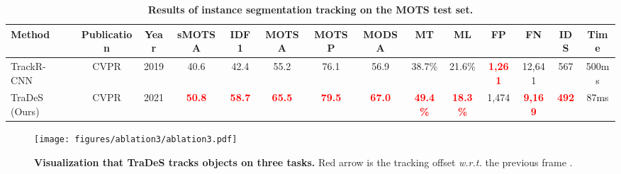 \documentclass[final]{cvpr}
\begin{document}
\begin{table*}[!htb]
	\begin{center}	
		\setlength{\tabcolsep}{1.5pt}
		\small
		\begin{tabular}{l|cc|ccccccccccc }
			\shline
			\rowcolor{mygray}
			Method&Publication&Year&sMOTSA &IDF1 &MOTSA &MOTSP &MODSA &MT & ML &FP&FN&IDS &Time\\ 
			\hline
			\hline
			TrackR-CNN~\cite{mots_dataset} &CVPR&2019&40.6&42.4&55.2&76.1&56.9&38.7\%&21.6\%&\textcolor{red}{\bf 1,261}&12,641&567&500ms\\
			TraDeS (Ours)&CVPR&2021&\textcolor{red}{\bf 50.8}&\textcolor{red}{\bf 58.7}&\textcolor{red}{\bf 65.5} &\textcolor{red}{\bf 79.5}&\textcolor{red}{\bf 67.0}&\textcolor{red}{\bf 49.4\%}&\textcolor{red}{\bf 18.3\%}&1,474&\textcolor{red}{\bf 9,169}&\textcolor{red}{\bf 492}&87ms\\
			\hline
		\end{tabular}
	\vspace{-2mm}
	\end{center}
	\caption{\textbf{Results of instance segmentation tracking on the MOTS test set.}}
	\label{tab:mots_sota}
	\vspace{-3mm}
\end{table*}

\begin{figure*}[h!]
	\centering
	\vspace{-1mm}
	\texttt{[image: figures/ablation3/ablation3.pdf]}
	\vspace{-4mm}
	\caption{\textbf{Visualization that TraDeS tracks objects on three tasks.} Red arrow is the tracking offset  \emph{w.r.t.} the previous frame .}
	\label{fig:final_results}
	\vspace{-3mm}
\end{figure*}
\end{document}
